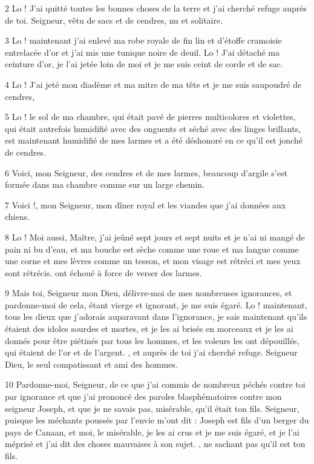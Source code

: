 \par 2 Lo ! J'ai quitté toutes les bonnes choses de la terre et j'ai cherché refuge auprès de toi. Seigneur, vêtu de sacs et de cendres, nu et solitaire.

\par 3 Lo ! maintenant j'ai enlevé ma robe royale de fin lin et d'étoffe cramoisie entrelacée d'or et j'ai mis une tunique noire de deuil. Lo ! J'ai détaché ma ceinture d'or, je l'ai jetée loin de moi et je me suis ceint de corde et de sac.

\par 4 Lo ! J'ai jeté mon diadème et ma mitre de ma tête et je me suis saupoudré de cendres,

\par 5 Lo ! le sol de ma chambre, qui était pavé de pierres multicolores et violettes, qui était autrefois humidifié avec des onguents et séché avec des linges brillants, est maintenant humidifié de mes larmes et a été déshonoré en ce qu'il est jonché de cendres.

\par 6 Voici, mon Seigneur, des cendres et de mes larmes, beaucoup d'argile s'est formée dans ma chambre comme sur un large chemin.

\par 7 Voici !, mon Seigneur, mon dîner royal et les viandes que j'ai données aux chiens.

\par 8 Lo ! Moi aussi, Maître, j'ai jeûné sept jours et sept nuits et je n'ai ni mangé de pain ni bu d'eau, et ma bouche est sèche comme une roue et ma langue comme une corne et mes lèvres comme un tesson, et mon visage est rétréci et mes yeux sont rétrécis. ont échoué à force de verser des larmes.

\par 9 Mais toi, Seigneur mon Dieu, délivre-moi de mes nombreuses ignorances, et pardonne-moi de cela, étant vierge et ignorant, je me suis égaré. Lo ! maintenant, tous les dieux que j'adorais auparavant dans l'ignorance, je sais maintenant qu'ils étaient des idoles sourdes et mortes, et je les ai brisés en morceaux et je les ai donnés pour être piétinés par tous les hommes, et les voleurs les ont dépouillés, qui étaient de l'or et de l'argent. , et auprès de toi j'ai cherché refuge. Seigneur Dieu, le seul compatissant et ami des hommes.

\par 10 Pardonne-moi, Seigneur, de ce que j'ai commis de nombreux péchés contre toi par ignorance et que j'ai prononcé des paroles blasphématoires contre mon seigneur Joseph, et que je ne savais pas, misérable, qu'il était ton fils. Seigneur, puisque les méchants poussés par l'envie m'ont dit : Joseph est fils d'un berger du pays de Canaan, et moi, le misérable, je les ai crus et je me suis égaré, et je l'ai méprisé et j'ai dit des choses mauvaises à son sujet. , ne sachant pas qu'il est ton fils.

